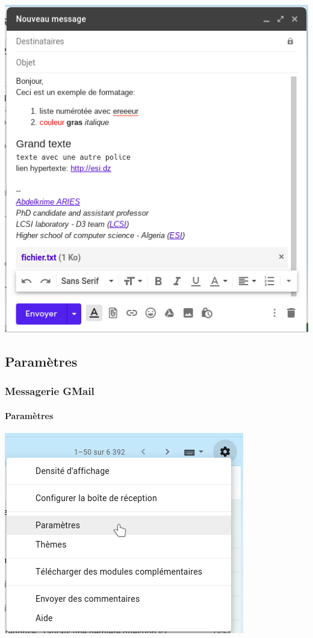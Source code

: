 \documentclass{beamer}
\begin{document}
\begin{frame}
\begin{minipage}{0.48\textwidth}
	\includegraphics[width=\textwidth]{..//img/Bweb02-ri-gmail/gmail-new.png}
\end{minipage}


\end{frame}

\subsection{Paramètres}

\begin{frame}
\frametitle{Messagerie GMail}
\framesubtitle{Paramètres}

\includegraphics[width=.60\textwidth]{..//img/Bweb02-ri-gmail/gmail-parametre.png}

\end{frame}
\end{document}
